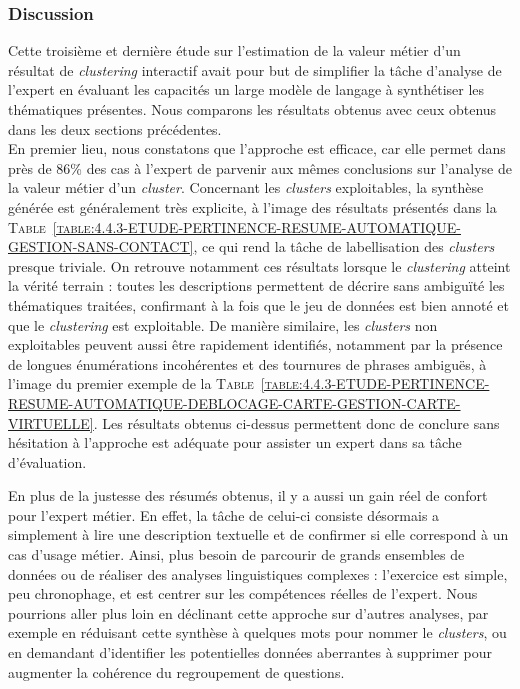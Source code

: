 		\subsubsection{Discussion}
			
			Cette troisième et dernière étude sur l'estimation de la valeur métier d'un résultat de \textit{clustering} interactif avait pour but de simplifier la tâche d'analyse de l'expert en évaluant les capacités un large modèle de langage à synthétiser les thématiques présentes.
			Nous comparons les résultats obtenus avec ceux obtenus dans les deux sections précédentes.
			\\
			
			En premier lieu, nous constatons que l'approche est efficace, car elle permet dans près de $86$\% des cas à l'expert de parvenir aux mêmes conclusions sur l'analyse de la valeur métier d'un \textit{cluster}.
			Concernant les \textit{clusters} exploitables, la synthèse générée est généralement très explicite, à l'image des résultats présentés dans la \textsc{Table~\ref{table:4.4.3-ETUDE-PERTINENCE-RESUME-AUTOMATIQUE-GESTION-SANS-CONTACT}}, ce qui rend la tâche de labellisation des \textit{clusters} presque triviale.
			On retrouve notamment ces résultats lorsque le \textit{clustering} atteint la vérité terrain : toutes les descriptions permettent de décrire sans ambiguïté les thématiques traitées, confirmant à la fois que le jeu de données est bien annoté et que le \textit{clustering} est exploitable.
			De manière similaire, les \textit{clusters} non exploitables peuvent aussi être rapidement identifiés, notamment par la présence de longues énumérations incohérentes et des tournures de phrases ambiguës, à l'image du premier exemple de la \textsc{Table~\ref{table:4.4.3-ETUDE-PERTINENCE-RESUME-AUTOMATIQUE-DEBLOCAGE-CARTE-GESTION-CARTE-VIRTUELLE}}.
			Les résultats obtenus ci-dessus permettent donc de conclure sans hésitation à l'approche est adéquate pour assister un expert dans sa tâche d'évaluation.
			
			En plus de la justesse des résumés obtenus, il y a aussi un gain réel de confort pour l'expert métier.
			En effet, la tâche de celui-ci consiste désormais a simplement à lire une description textuelle et de confirmer si elle correspond à un cas d'usage métier.
			Ainsi, plus besoin de parcourir de grands ensembles de données ou de réaliser des analyses linguistiques complexes : l'exercice est simple, peu chronophage, et est centrer sur les compétences réelles de l'expert.
			Nous pourrions aller plus loin en déclinant cette approche sur d'autres analyses, par exemple en réduisant cette synthèse à quelques mots pour nommer le \textit{clusters}, ou en demandant d'identifier les potentielles données aberrantes à supprimer pour augmenter la cohérence du regroupement de questions.
			\\
			
